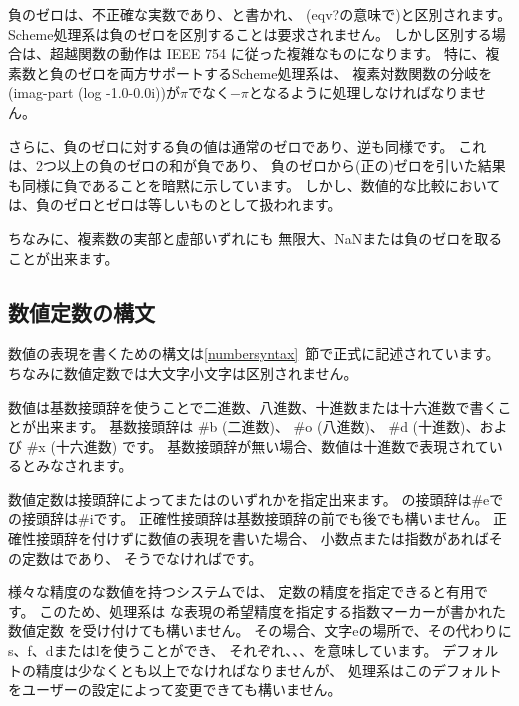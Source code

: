 
負のゼロは、不正確な実数であり、{}と書かれ、
({\cf eqv?}の意味で){}と区別されます。
Scheme処理系は負のゼロを区別することは要求されません。
しかし区別する場合は、超越関数の動作は IEEE 754 に従った複雑なものになります。
特に、複素数と負のゼロを両方サポートするScheme処理系は、
複素対数関数の分岐を{\cf (imag-part (log -1.0-0.0i))}が$\pi$でなく$-\pi$となるように処理しなければなりません。

さらに、負のゼロに対する負の値は通常のゼロであり、逆も同様です。
これは、2つ以上の負のゼロの和が負であり、
負のゼロから(正の)ゼロを引いた結果も同様に負であることを暗黙に示しています。
しかし、数値的な比較においては、負のゼロとゼロは等しいものとして扱われます。

ちなみに、複素数の実部と虚部いずれにも
無限大、NaNまたは負のゼロを取ることが出来ます。

\subsection{数値定数の構文}
\label{numbernotations}

数値の表現を書くための構文は\ref{numbersyntax}~節で正式に記述されています。
ちなみに数値定数では大文字小文字は区別されません。

数値は基数接頭辞を使うことで二進数、八進数、十進数または十六進数で書くことが出来ます。
基数接頭辞は
{\cf \#b} (二進数)、
{\cf \#o} (八進数)、
{\cf \#d} (十進数)、および
{\cf \#x} (十六進数) です。
基数接頭辞が無い場合、数値は十進数で表現されているとみなされます。

数値定数は接頭辞によってまたはのいずれかを指定出来ます。
の接頭辞は{\cf \#e}で
の接頭辞は{\cf \#i}です。
正確性接頭辞は基数接頭辞の前でも後でも構いません。
正確性接頭辞を付けずに数値の表現を書いた場合、
小数点または指数があればその定数はであり、
そうでなければです。

様々な精度のな数値を持つシステムでは、
定数の精度を指定できると有用です。
このため、処理系は
な表現の希望精度を指定する指数マーカーが書かれた数値定数
を受け付けても構いません。
その場合、文字{\cf e}の場所で、その代わりに
{\cf s}、{\cf f}、{\cf d}または{\cf l}を使うことができ、
それぞれ、、、を意味しています。
デフォルトの精度は少なくとも以上でなければなりませんが、
処理系はこのデフォルトをユーザーの設定によって変更できても構いません。

